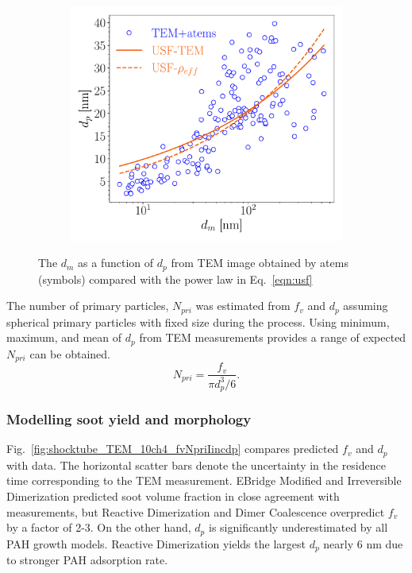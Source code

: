 \begin{figure}[H]
	\centering
	\begin{subfigure}[t]{0.32\textwidth}
		\includegraphics[width=1\textwidth]{Figures/Results/Shocktube/Stanford/TEM/dmdp_scalelaw.pdf}
	\end{subfigure}
	\caption{The $d_m$ as a function of $d_p$ from TEM image obtained by atems~\citep{sipkens2021using} (symbols) compared with the power law in Eq.~\eqref{eqn:usf}} 
	\label{fig:shocktube_TEM_powerlaws} 
\end{figure}

The number of primary particles, $N_{pri}$ was estimated from $f_v$ and $d_p$ assuming spherical primary particles with fixed size during the process. Using minimum, maximum, and mean of $d_p$ from TEM measurements provides a range of expected $N_{pri}$ can be obtained.
\begin{equation}
	N_{pri}=\frac{f_v}{\pi d_p^3/6} 
	\label{eqn:Npriinfered}.
\end{equation}


\subsubsection{Modelling soot yield and morphology}

Fig.~\ref{fig:shocktube_TEM_10ch4_fvNpriIincdp} compares predicted $f_v$ and $d_p$ with data. The horizontal scatter bars denote the uncertainty in the residence time corresponding to the TEM measurement. EBridge Modified and Irreversible Dimerization predicted soot volume fraction in close agreement with measurements, but Reactive Dimerization and Dimer Coalescence overpredict $f_v$ by a factor of 2-3. On the other hand, $d_p$ is significantly underestimated by all PAH growth models. Reactive Dimerization yields the largest $d_p$ nearly 6 nm due to stronger PAH adsorption rate.


